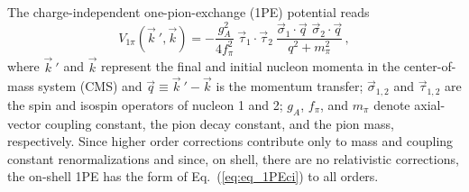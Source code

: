 The charge-independent one-pion-exchange (1PE) potential reads
\begin{equation}
V_{1\pi} ({\vec k}~', \vec k) = - 
\frac{g_A^2}{4f_\pi^2}
\: 
{\vec \tau}_1 \cdot {\vec \tau}_2 
\:
\frac{
\vec \sigma_1 \cdot \vec q \,\, \vec \sigma_2 \cdot \vec q}
{q^2 + m_\pi^2} 
\,,
\label{eq:eq_1PEci}
\end{equation}
where ${\vec k}~'$ and $\vec k$ represent the final and initial
nucleon momenta in the center-of-mass system (CMS) and $\vec q \equiv
{\vec k}~' - \vec k$ is the momentum transfer; $\vec \sigma_{1,2}$ and
$\vec \tau_{1,2}$ are the spin and isospin operators of nucleon 1 and
2; $g_A$, $f_\pi$, and $m_\pi$ denote axial-vector coupling constant,
the pion decay constant, and the pion mass, respectively. 
Since higher order corrections contribute only to mass
and coupling constant renormalizations and since, on shell, there are
no relativistic corrections, the on-shell 1PE has the form
of Eq.~(\ref{eq:eq_1PEci}) to all orders.


